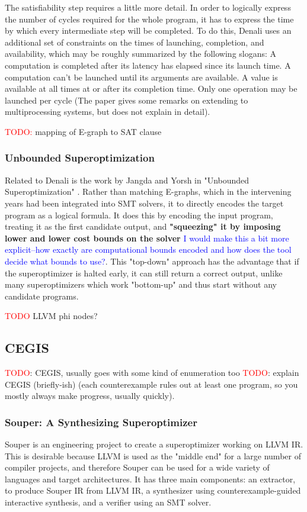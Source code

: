 \documentclass[12pt,twoside]{reedthesis}
\newcommand{\red}[1]{\textcolor{red}{#1}}
\newcommand{\comment}[2]{\textbf{#1} \textcolor{blue}{#2}}
\begin{document}
The satisfiability step requires a little more detail.
In order to logically express the number of cycles required for the whole program, it has to express the time by which every intermediate step will be completed.
To do this, Denali uses an additional set of constraints on the times of launching, completion, and availability, which may be roughly summarized by the following slogans:
    A computation is completed after its latency has elapsed since its launch time.
    A computation can't be launched until its arguments are available.
    A value is available at all times at or after its completion time.
    Only one operation may be launched per cycle (The paper gives some remarks on extending to multiprocessing systems, but does not explain in detail).

\red{TODO:} mapping of E-graph to SAT clause

\subsubsection{Unbounded Superoptimization}
Related to Denali is the work by Jangda and Yorsh in "Unbounded Superoptimization" \cite{jangda2017unbounded}.
Rather than matching E-graphs, which in the intervening years had been integrated into SMT solvers, it to directly encodes the target program as a logical formula.
It does this by encoding the input program, treating it as the first candidate output, and \comment{"squeezing" it by imposing lower and lower cost bounds on the solver}{I would make this a bit more explicit--how exactly are computational bounds encoded and how does the tool decide what bounds to use?}. This "top-down" approach has the advantage that if the superoptimizer is halted early, it can still return a correct output, unlike many superoptimizers which work "bottom-up" and thus start without any candidate programs.

\red{TODO} LLVM phi nodes?

\subsection{CEGIS}

\red{TODO}: CEGIS, usually goes with some kind of enumeration too
\red{TODO}: explain CEGIS (briefly-ish) (each counterexample rules out at least one program, so you mostly always make progress, usually quickly).

\subsubsection{Souper: A Synthesizing Superoptimizer}
Souper \cite{sasnauskas2017souper} is an engineering project to create a superoptimizer working on LLVM IR.
This is desirable because LLVM is used as the "middle end" for a large number of compiler projects, and therefore Souper can be used for a wide variety of languages and target architectures.
It has three main components:
    an extractor, to produce Souper IR from LLVM IR,
    a synthesizer using counterexample-guided interactive synthesis,
    and a verifier using an SMT solver.
\end{document}

